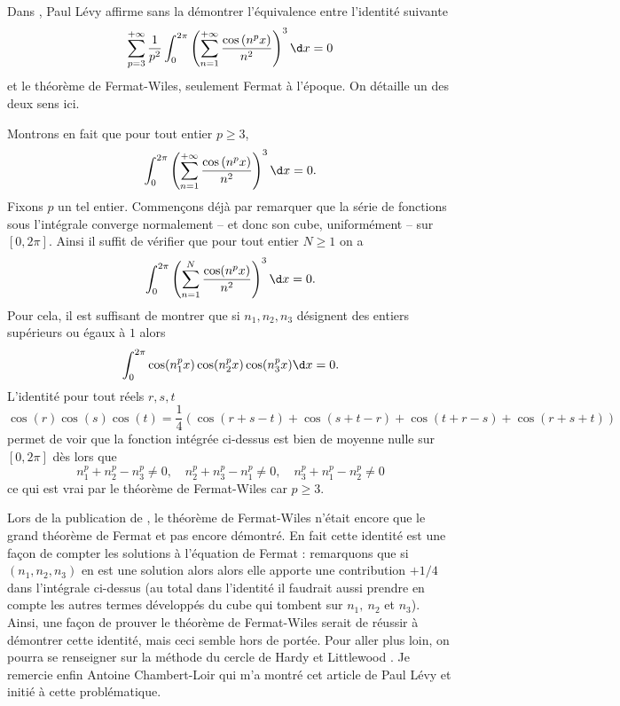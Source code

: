 \documentclass{notes}
\begin{document}

Dans \cite{Levy}, Paul Lévy affirme sans la démontrer l'équivalence entre l'identité suivante
\[ \sum_{p=3}^{+\infty} \frac{1}{p^{2}} \int_{0}^{2\pi} \left( \sum_{n=1}^{+\infty} \frac{\cos\left( n^{p }x \right)}{n^{2}} \right)^{3}  \d x = 0  \]
et le théorème de Fermat-Wiles, seulement Fermat à l'époque. On détaille un des deux sens ici. 

Montrons en fait que pour tout entier $p\geq 3$, 
\[ \int_{0}^{2\pi} \left( \sum_{n=1}^{+\infty} \frac{\cos\left( n^{p }x \right)}{n^{2}} \right)^{3}  \d x = 0 .  \]
Fixons $p$ un tel entier. Commençons déjà par remarquer que la série de fonctions sous l'intégrale converge normalement -- et donc son cube, uniformément -- sur $[0,2\pi]$. Ainsi il suffit de vérifier que pour tout entier $N\geq 1$ on a 
\[  \int_{0}^{2\pi}   \left( \sum_{n=1}^{N} \frac{\cos(n^{p}x)}{n^{2}} \right)^{3} \d x = 0. \]
Pour cela, il est suffisant de montrer que si $n_1,n_2,n_3$ désignent des entiers supérieurs ou égaux à $1$ alors 
\[ \int_{0}^{2\pi} \cos(n_1^{p} x)\cos(n_2^{p}x) \cos(n_3^{p}x) \d x = 0.\]
L'identité pour tout réels $r,s,t$ 
\[\cos \left( r \right) \cos \left( s \right) \cos \left( t \right) = \frac 14 \left( \cos(r+s-t)+\cos(s+t-r) + \cos(t+r-s) + \cos(r+s+t) \right)\]
permet de voir que la fonction intégrée ci-dessus est bien de moyenne nulle sur $[0,2\pi]$ dès lors que 
\[ n_1^p+n_2^p-n_3^p \neq 0, \quad n_2^p+n_3^p-n_1^p \neq 0,\quad n_3^p+n_1^p-n_2^p \neq 0 \] 
ce qui est vrai par le théorème de Fermat-Wiles car $p \geq 3$.


\begin{rem}
  Lors de la publication de \cite{Levy}, le théorème de Fermat-Wiles n'était encore que le grand théorème de Fermat et pas encore démontré. En fait cette identité est une façon de compter les solutions à l'équation de Fermat : remarquons que si $(n_1,n_2,n_3)$ en est une solution alors alors elle apporte une contribution $+1/4$ dans l'intégrale ci-dessus (au total dans l'identité il faudrait aussi prendre en compte les autres termes développés du cube qui tombent sur $n_1,\ n_2$ et $n_3$).  Ainsi, une façon de prouver le théorème de Fermat-Wiles serait de réussir à démontrer cette identité, mais ceci semble hors de portée. Pour aller plus loin, on pourra se renseigner sur la méthode du cercle de Hardy et Littlewood \cite{HW}.   Je remercie enfin Antoine Chambert-Loir qui m'a montré cet article de Paul Lévy et initié à cette problématique.
\end{rem}





 
\end{document}
